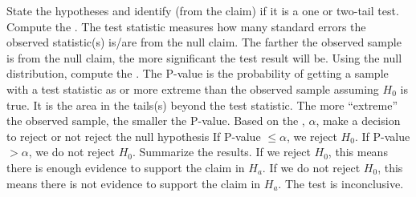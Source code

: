 \pagestyle{fancy}
\renewcommand{\theUnit}{8}
\ifthenelse{\isundefined{\UnitPageNumbers}}{}{\setcounter{page}{1}}
\rhead{Chapter  \theUnit: Hypothesis Tests}
\rfoot{\mypage}
\renewcommand{\footrulewidth}{.4pt}
\vspace*{-20pt} \thispagestyle{firstfooter}




\bbox
\bb
\ii State the hypotheses and identify (from the claim) if it is a one or two-tail test.
\ii Compute the \textbf{}.
\bi
\ii The test statistic measures how many standard errors the observed statistic(s) is/are from the null claim.
\ii The farther the observed sample is from the null claim, the more significant the test result will be.
\ei
\ii Using the null distribution, compute the \textbf{}.
\bi
\ii The P-value is the probability of getting a sample with a test statistic as or more extreme than the observed sample assuming $H_0$ is true.
\ii It is the area in the tails(s) beyond the test statistic.
\ii The more ``extreme'' the observed sample, the smaller the P-value.
\ei
\ii Based on the \textbf{}, $\alpha$, make a decision to reject or not reject the null hypothesis
\bi
\ii If P-value $\leq  \alpha$, we reject $H_0$.
\ii If P-value $> \alpha$, we do not reject $H_0$.
\ei
\ii Summarize the results. 
\bi
\ii If we reject $H_0$, this means there is enough evidence to support the claim in $H_a$.
\ii If we do not reject $H_0$, this means there is not evidence to support the claim in $H_a$. The test is inconclusive.
\ei
\ee
\ebox

\pagebreak


